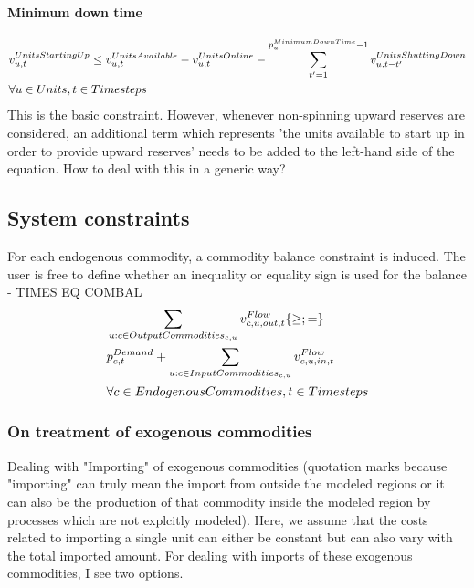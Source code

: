 \documentclass[10pt,english]{article}
\begin{document}
\paragraph{Minimum down time}
\begin{align} \label{eq:minimumdowntime}
&\vUnitsStartingUp \le \vUnitsAvailable - \vUnitsOnline - \sum_{\timestep'=1}^{\pMinimumDownTime - 1} \vUnitsShuttingDown[\unit,\timestep-\timestep'] \nonumber \\
& \forall \units, \timesteps
\end{align}
{\color{red} This is the basic constraint. However, whenever non-spinning upward reserves are considered, an additional term which represents 'the units available to start up in order to provide upward reserves' needs to be added to the left-hand side of the equation. How to deal with this in a generic way?}






\subsection{System constraints}

For each endogenous commodity, a commodity balance constraint is induced. The user is free to define whether an inequality or equality sign is used for the balance - TIMES EQ COMBAL
\begin{align} \label{eq:commodity_balance}
&\sum_{\unit : \commodity \in \OutputCommodities} \vFlow[\commodity,\unit,out,\timestep] \{\ge;=\} \nonumber \\ 
&\pDemand + \sum_{\unit: \commodity \in \InputCommodities} \vFlow[\commodity,\unit,in,\timestep] \nonumber \\ 
& \forall \EndogenousCommodities, \timesteps 
\end{align}


\subsubsection{On treatment of exogenous commodities}
Dealing with "Importing" of exogenous commodities (quotation marks because "importing" can truly mean the import from outside the modeled regions or it can also be the production of that commodity inside the modeled region by processes which are not explcitly modeled). Here, we assume that the costs related to importing a single unit can either be constant but can also vary with the total imported amount. For dealing with imports of these exogenous commodities, I see two options.
\end{document}

